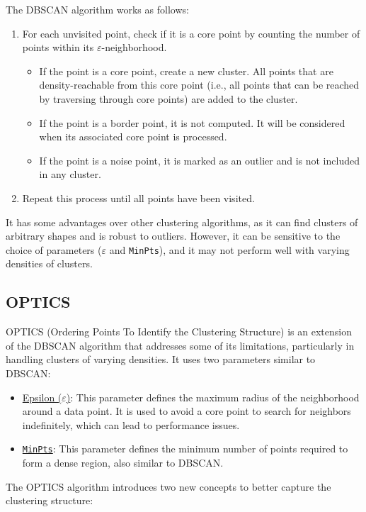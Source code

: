 The DBSCAN algorithm works as follows:
\begin{enumerate}
    \item For each unvisited point, check if it is a core point by counting the number of points within its $\varepsilon$-neighborhood.
    \begin{itemize}
        \item If the point is a core point, create a new cluster. All points that are density-reachable from this core point (i.e., all points that can be reached by traversing through core points) are added to the cluster.
        \item If the point is a border point, it is not computed. It will be considered when its associated core point is processed.
        \item If the point is a noise point, it is marked as an outlier and is not included in any cluster.
    \end{itemize}
    \item Repeat this process until all points have been visited.
\end{enumerate}

It has some advantages over other clustering algorithms, as it can find clusters of arbitrary shapes and is robust to outliers. However, it can be sensitive to the choice of parameters ($\varepsilon$ and \texttt{MinPts}), and it may not perform well with varying densities of clusters.

\subsection{OPTICS}

OPTICS (Ordering Points To Identify the Clustering Structure) is an extension of the DBSCAN algorithm that addresses some of its limitations, particularly in handling clusters of varying densities. It uses two parameters similar to DBSCAN:
\begin{itemize}
    \item \ul{Epsilon ($\varepsilon$)}: This parameter defines the maximum radius of the neighborhood around a data point. It is used to avoid a core point to search for neighbors indefinitely, which can lead to performance issues.
    \item \ul{\texttt{MinPts}}: This parameter defines the minimum number of points required to form a dense region, also similar to DBSCAN.
\end{itemize}

The OPTICS algorithm introduces two new concepts to better capture the clustering structure:

